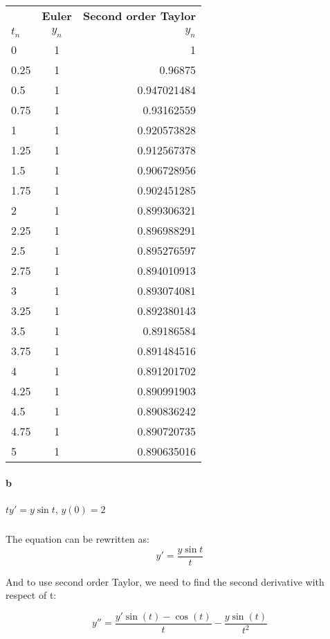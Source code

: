 \documentclass{article}
\begin{document}
\begin{table}[ht]
  \begin{center}
    \label{tab:table 2.a}
    \begin{tabular}{|l|c|r|} %
    \hline
     &\textbf{Euler}&\textbf{Second order Taylor}\\
    $t_n$&$y_n$&$y_n$\\
    \hline
    0&1&1\\
    0.25&1&0.96875\\
    0.5&1&0.947021484\\
    0.75&1&0.93162559\\
    1&1&0.920573828\\
    1.25&1&0.912567378\\
    1.5&1&0.906728956\\
    1.75&1&0.902451285\\
    2&1&0.899306321\\
    2.25&1&0.896988291\\
    2.5&1&0.895276597\\
    2.75&1&0.894010913\\
    3&1&0.893074081\\
    3.25&1&0.892380143\\
    3.5&1&0.89186584\\
    3.75&1&0.891484516\\
    4&1&0.891201702\\
    4.25&1&0.890991903\\
    4.5&1&0.890836242\\
    4.75&1&0.890720735\\
    5&1&0.890635016\\
    \hline
    \end{tabular}
  \end{center}
\end{table}

\newpage

\paragraph{b} $ty' = y\sin{t}$, $y(0)=2$
\subparagraph{} The equation can be rewritten as:
\[
    y' = \frac{y\sin{t}}{t}
\]

And to use second order Taylor, we need to find the
second derivative with respect of t:

\[
    y'' =  \frac{ y' \sin{(t)} -\cos{(t)}}{t} - \frac{y\sin{(t)}}{t^2}
\]
\end{document}
